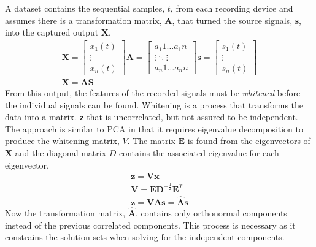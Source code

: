 A dataset contains the sequential samples, $t$, from each recording device and assumes there is a transformation matrix, $\bm{A}$, that turned the source signals, $\bm{s}$, into the captured output $\bm{X}$.
\begin{gather}
\bm{X} = \begin{bmatrix} x_{1}(t) \\ \vdots \\ x_{n}(t) \end{bmatrix}
\bm{A} = \begin{bmatrix} a_{1}{1} \dots a_{1}{n} \\ \vdots \ddots \vdots \\ a_{n}{1} \dots a_{n}{n} \end{bmatrix}
\bm{s} = \begin{bmatrix} s_{1}(t) \\ \vdots \\ s_{n}(t) \end{bmatrix}
\\
\bm{X} = \bm{A} \bm{S}
\end{gather}
From this output, the features of the recorded signals must be \emph{whitened} before the individual signals can be found. Whitening is a process that transforms the data into a matrix. $\bm{z}$ that is uncorrelated, but not assured to be independent. The approach is similar to \ac{PCA} in that it requires eigenvalue decomposition to produce the whitening matrix, $V$. The matrix $\bm{E}$ is found from the eigenvectors of $\bm{X}$ and the diagonal matrix $D$ contains the associated eigenvalue for each eigenvector.
\begin{gather}
\bm{z} = \bm{V}\bm{x} \\
\bm{V} = \bm{E}\bm{D}^{-\frac{1}{2}}\bm{E}^{T} \\
\bm{z} = \bm{V}\bm{A}\bm{s} = \hat{\bm{A}}\bm{s}
\end{gather}
Now the transformation matrix, $\hat{\bm{A}}$, contains only orthonormal components instead of the previous correlated components. This process is necessary as it constrains the solution sets when solving for the independent components.

